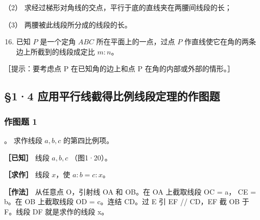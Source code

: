 （2） 求经过梯形对角线的交点，平行于底的直线夹在两腰间线段的长；

（3） 两腰被此线段所分成的线段的长。

\begin{enumerate}
\setcounter{enumi}{15}
\item
  已知 \(P\) 是一个定角 \(ABC\) 所在平面上的一点，过点 \(P\)
  作直线使它在角的两条边上所截到的线段成定比 \(m:n\)。
\end{enumerate}

［提示：要考虑点 P 在已知角的边上和点 P 在角的内部或外部的情形。］

\subsection{§1·4
应用平行线截得比例线段定理的作图题}

\subsubsection{作图题 1}

。 求作线段 \(a, b, c\) 的第四比例项。

\textbf{［已知］} 线段 \(a, b, c\) （图1·20）。

\textbf{［求作］} 线段 \(x\)，使 \(a:b = c:x\)。

\textbf{［作法］} 从任意点 O，引射线 OA 和 OB。在 OA 上截取线段 OC = a，
CE = b。在 OB 上截取线段 OD = c。连结 CD。过 E 引 EF // CD，EF 截 OB 于
F。线段 DF 就是求作的线段 x。

